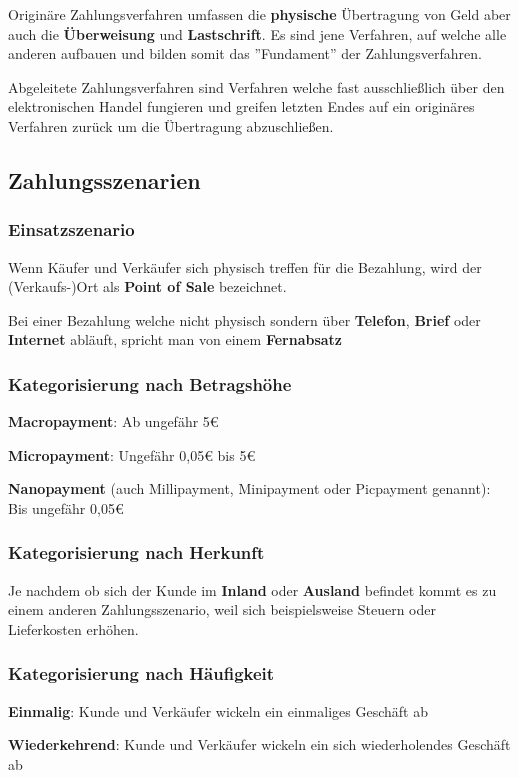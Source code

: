 Originäre Zahlungsverfahren umfassen die \textbf{physische} Übertragung von Geld aber auch die \textbf{Überweisung} und \textbf{Lastschrift}. Es sind jene Verfahren, auf welche alle anderen aufbauen und bilden somit das ''Fundament'' der Zahlungsverfahren.

Abgeleitete Zahlungsverfahren sind Verfahren welche fast ausschließlich über den elektronischen Handel fungieren und greifen letzten Endes auf ein originäres Verfahren zurück um die Übertragung abzuschließen.

\subsection{Zahlungsszenarien}
\subsubsection{Einsatzszenario}
Wenn Käufer und Verkäufer sich physisch treffen für die Bezahlung, wird der (Verkaufs-)Ort als \textbf{Point of Sale} bezeichnet.

Bei einer Bezahlung welche nicht physisch sondern über \textbf{Telefon}, \textbf{Brief} oder \textbf{Internet} abläuft, spricht man von einem \textbf{Fernabsatz}

\subsubsection{Kategorisierung nach Betragshöhe}
\textbf{Macropayment}: Ab ungefähr 5€

\textbf{Micropayment}: Ungefähr 0,05€ bis 5€

\textbf{Nanopayment} (auch Millipayment, Minipayment oder Picpayment genannt): Bis ungefähr 0,05€ 

\subsubsection{Kategorisierung nach Herkunft}
Je nachdem ob sich der Kunde im \textbf{Inland} oder \textbf{Ausland} befindet kommt es zu einem anderen Zahlungsszenario, weil sich beispielsweise Steuern oder Lieferkosten erhöhen.


\subsubsection{Kategorisierung nach Häufigkeit}
\textbf{Einmalig}: Kunde und Verkäufer wickeln ein einmaliges Geschäft ab

\textbf{Wiederkehrend}: Kunde und Verkäufer wickeln ein sich wiederholendes Geschäft ab
 
